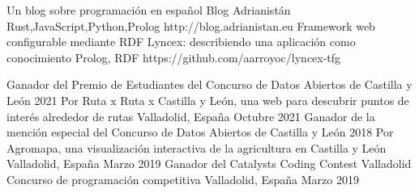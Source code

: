 \documentclass[]{awesome-cv}
\begin{document}
\vspace{-7mm}
\begin{cventries}
	\cventry
	{Un blog sobre programación en español}
	{Blog Adrianistán}
	{Rust,JavaScript,Python,Prolog}
	{http://blog.adrianistan.eu}
    {}
    \cventry
    {Framework web configurable mediante RDF}
    {Lyncex: describiendo una aplicación como conocimiento}
    {Prolog, RDF}
    {https://github.com/aarroyoc/lyncex-tfg}
    {}

	\vspace{-5mm}
\end{cventries}
\begin{cvhonors}
    \cvhonor
	{Ganador del Premio de Estudiantes del Concurso de Datos Abiertos de Castilla y León 2021}
	{Por Ruta x Ruta x Castilla y León, una web para descubrir puntos de interés alrededor de rutas}
	{Valladolid, España}
	{Octubre 2021}
	\cvhonor
	{Ganador de la mención especial del Concurso de Datos Abiertos de Castilla y León 2018}
	{Por Agromapa, una visualización interactiva de la agricultura en Castilla y León}
	{Valladolid, España}
	{Marzo 2019}
	\cvhonor
	{Ganador del Catalysts Coding Contest Valladolid}
	{Concurso de programación competitiva}
	{Valladolid, España}
	{Marzo 2019}
\end{cvhonors}
\ 
\end{document}

